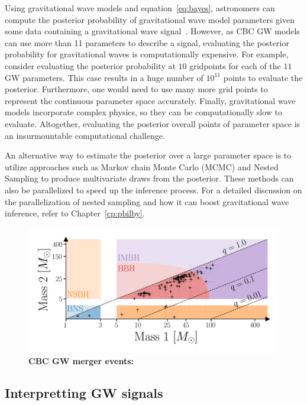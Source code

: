 Using gravitational wave models and equation~\ref{eq:bayes}, astronomers can compute the posterior probability of gravitational wave model parameters given some data containing a gravitational wave signal~\cite{abbott2018prospects}.
However, as CBC GW models can use more than 11 parameters to describe a signal, evaluating the posterior probability for gravitational waves is computationally expensive. 
For example, consider evaluating the posterior probability at $10$ gridpoints for each of the $11$ GW parameters.
This case results in a huge number of $10^11$ points to evaluate the posterior.
Furthermore, one would need to use many more grid points to represent the continuous parameter space accurately.
Finally, gravitational wave models incorporate complex physics, so they can be computationally slow to evaluate. 
Altogether, evaluating the posterior overall points of parameter space is an insurmountable computational challenge.

An alternative way to estimate the posterior over a large parameter space is to utilize approaches such as Markov chain Monte Carlo (MCMC) and Nested Sampling to produce multivariate draws from the posterior. 
These methods can also be parallelized to speed up the inference process. 
For a detailed discussion on the parallelization of nested sampling and how it can boost gravitational wave inference, refer to Chapter~\ref{cp:pbilby}. 


\begin{figure}
\begin{center}
  \centerline{\includegraphics[width=1.1\linewidth]{src/figures/gw_catalog.png}}
  \caption{\textbf{CBC GW merger events:}  }
  \label{fig:cbc_mergers}
\end{center}
\end{figure}

\subsection{Interpretting GW signals}

